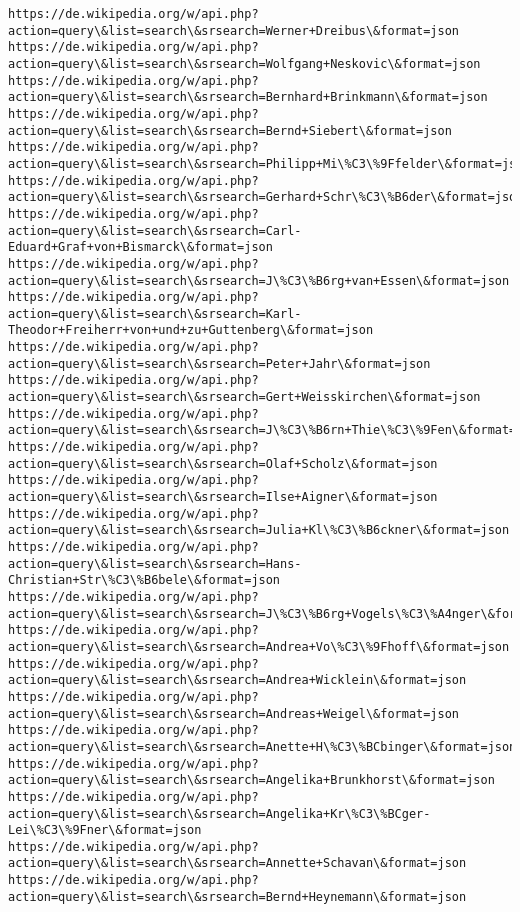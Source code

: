 \documentclass[11pt]{article}
\begin{document}
\begin{Verbatim}[commandchars=\\\{\}]
https://de.wikipedia.org/w/api.php?action=query\&list=search\&srsearch=Werner+Dreibus\&format=json
https://de.wikipedia.org/w/api.php?action=query\&list=search\&srsearch=Wolfgang+Neskovic\&format=json
https://de.wikipedia.org/w/api.php?action=query\&list=search\&srsearch=Bernhard+Brinkmann\&format=json
https://de.wikipedia.org/w/api.php?action=query\&list=search\&srsearch=Bernd+Siebert\&format=json
https://de.wikipedia.org/w/api.php?action=query\&list=search\&srsearch=Philipp+Mi\%C3\%9Ffelder\&format=json
https://de.wikipedia.org/w/api.php?action=query\&list=search\&srsearch=Gerhard+Schr\%C3\%B6der\&format=json
https://de.wikipedia.org/w/api.php?action=query\&list=search\&srsearch=Carl-Eduard+Graf+von+Bismarck\&format=json
https://de.wikipedia.org/w/api.php?action=query\&list=search\&srsearch=J\%C3\%B6rg+van+Essen\&format=json
https://de.wikipedia.org/w/api.php?action=query\&list=search\&srsearch=Karl-Theodor+Freiherr+von+und+zu+Guttenberg\&format=json
https://de.wikipedia.org/w/api.php?action=query\&list=search\&srsearch=Peter+Jahr\&format=json
https://de.wikipedia.org/w/api.php?action=query\&list=search\&srsearch=Gert+Weisskirchen\&format=json
https://de.wikipedia.org/w/api.php?action=query\&list=search\&srsearch=J\%C3\%B6rn+Thie\%C3\%9Fen\&format=json
https://de.wikipedia.org/w/api.php?action=query\&list=search\&srsearch=Olaf+Scholz\&format=json
https://de.wikipedia.org/w/api.php?action=query\&list=search\&srsearch=Ilse+Aigner\&format=json
https://de.wikipedia.org/w/api.php?action=query\&list=search\&srsearch=Julia+Kl\%C3\%B6ckner\&format=json
https://de.wikipedia.org/w/api.php?action=query\&list=search\&srsearch=Hans-Christian+Str\%C3\%B6bele\&format=json
https://de.wikipedia.org/w/api.php?action=query\&list=search\&srsearch=J\%C3\%B6rg+Vogels\%C3\%A4nger\&format=json
https://de.wikipedia.org/w/api.php?action=query\&list=search\&srsearch=Andrea+Vo\%C3\%9Fhoff\&format=json
https://de.wikipedia.org/w/api.php?action=query\&list=search\&srsearch=Andrea+Wicklein\&format=json
https://de.wikipedia.org/w/api.php?action=query\&list=search\&srsearch=Andreas+Weigel\&format=json
https://de.wikipedia.org/w/api.php?action=query\&list=search\&srsearch=Anette+H\%C3\%BCbinger\&format=json
https://de.wikipedia.org/w/api.php?action=query\&list=search\&srsearch=Angelika+Brunkhorst\&format=json
https://de.wikipedia.org/w/api.php?action=query\&list=search\&srsearch=Angelika+Kr\%C3\%BCger-Lei\%C3\%9Fner\&format=json
https://de.wikipedia.org/w/api.php?action=query\&list=search\&srsearch=Annette+Schavan\&format=json
https://de.wikipedia.org/w/api.php?action=query\&list=search\&srsearch=Bernd+Heynemann\&format=json

\end{Verbatim}
\end{document}
